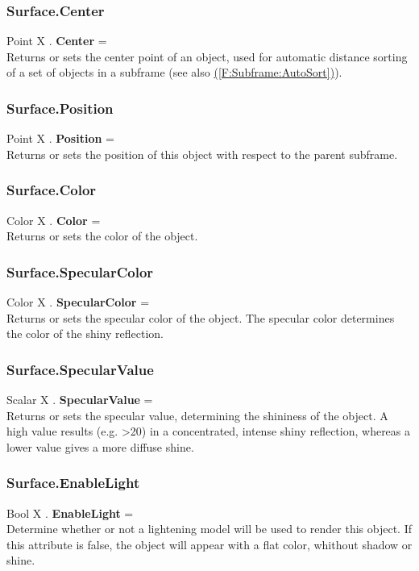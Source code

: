\documentclass[10pt]{book}
\newcommand{\linkitem}[1]{\hyperref[#1]{\nameref{#1} (\ref{#1})}}
\begin{document}
\subsubsection{Surface.Center \label{F:Surface:Center}}
Point X . \textbf{Center} = \\
Returns or sets the center point of an object, used for automatic distance sorting of a set of objects in a subframe (see also \linkitem{F:Subframe:AutoSort}).

\subsubsection{Surface.Position \label{F:Surface:Position}}
Point X . \textbf{Position} = \\
Returns or sets the position of this object with respect to the parent subframe.

\subsubsection{Surface.Color \label{F:Surface:Color}}
Color X . \textbf{Color} = \\
Returns or sets the color of the object.

\subsubsection{Surface.SpecularColor \label{F:Surface:SpecularColor}}
Color X . \textbf{SpecularColor} = \\
Returns or sets the specular color of the object. The specular color determines the color of the shiny reflection.

\subsubsection{Surface.SpecularValue \label{F:Surface:SpecularValue}}
Scalar X . \textbf{SpecularValue} = \\
Returns or sets the specular value, determining the shininess of the object. A high value results (e.g. >20) in a concentrated, intense shiny reflection, whereas a lower value gives a more diffuse shine.

\subsubsection{Surface.EnableLight \label{F:Surface:EnableLight}}
Bool X . \textbf{EnableLight} = \\
Determine whether or not a lightening model will be used to render this object. If this attribute is false, the object will appear with a flat color, whithout shadow or shine.
\end{document}
